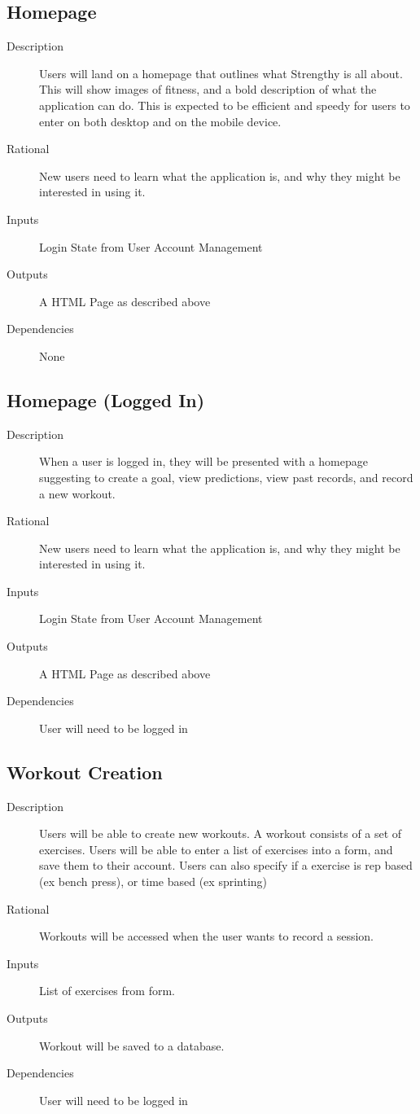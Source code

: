 \documentclass[12pt]{article}
\begin{document}
\subsection{Homepage}
\begin{description}
	\item[Description] Users will land on a homepage that outlines what Strengthy is all about. This will show images of fitness, and a bold description of what the application can do. This is expected to be efficient and speedy for users to enter on both desktop and on the mobile device.
	\item[Rational] New users need to learn what the application is, and why they might be interested in using it.
	\item[Inputs] Login State from User Account Management
	\item[Outputs] A HTML Page as described above
	\item[Dependencies] None
\end{description}

\subsection{Homepage (Logged In)}
\begin{description}
	\item[Description] When a user is logged in, they will be presented with a homepage suggesting to create a goal, view predictions, view past records, and record a new workout.
	\item[Rational] New users need to learn what the application is, and why they might be interested in using it.
	\item[Inputs] Login State from User Account Management
	\item[Outputs] A HTML Page as described above
	\item[Dependencies] User will need to be logged in
\end{description}

\subsection{Workout Creation}
\begin{description}
	\item[Description] Users will be able to create new workouts. A workout consists of a set of exercises. Users will be able to enter a list of exercises into a form, and save them to their account. Users can also specify if a exercise is rep based (ex bench press), or time based (ex sprinting)
	\item[Rational] Workouts will be accessed when the user wants to record a session.
	\item[Inputs] List of exercises from form.
	\item[Outputs] Workout will be saved to a database.
	\item[Dependencies] User will need to be logged in
\end{description}
\end{document}
